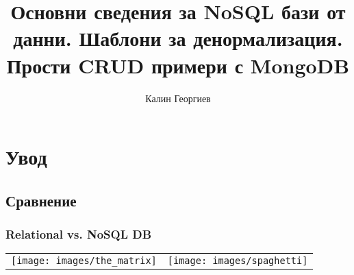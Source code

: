 \documentclass{beamer}
\begin{document}
\title[MongoDB]{Основни сведения за NoSQL бази от данни. Шаблони за денормализация. Прости CRUD примери с MongoDB}
\author{Калин Георгиев}
\frame{\titlepage}

\section{Увод}
\subsection{Сравнение}


\begin{frame}[fragile]
\frametitle{Relational  vs. NoSQL DB}

\begin{center}

\begin{tabular}{ c | c }

\texttt{[image: images/the\_matrix]}

&

\texttt{[image: images/spaghetti]}

\end{tabular}

\end{center}


\end{frame}
\end{document}

